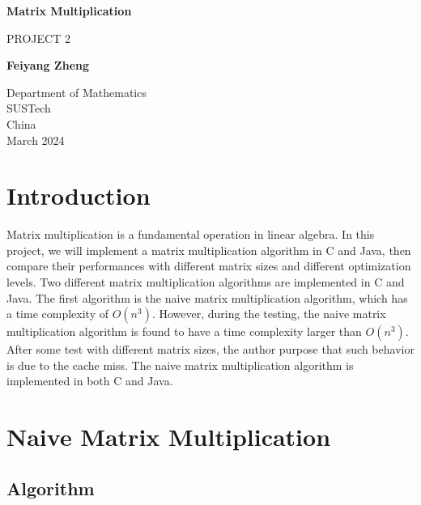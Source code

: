 \documentclass{article}
\begin{document}
\begin{titlepage}
  \begin{center}
    \vspace*{1cm}
    
    \Huge
    \textbf{Matrix Multiplication}
    
    \vspace{0.5cm}
    \LARGE
    PROJECT 2
    
    \vspace{1.5cm}
    
    \textbf{Feiyang Zheng}
    
    \vfill
    
    \vspace{0.8cm}
    
    \Large
    Department of Mathematics\\
    SUSTech\\
    China\\{March 2024}
    
  \end{center}
\end{titlepage}

\section{Introduction}

Matrix multiplication is a fundamental operation in linear algebra. In this project, we will implement a matrix multiplication algorithm in C and Java, then compare their performances with different matrix sizes and different optimization levels. Two different matrix multiplication algorithms are implemented in C and Java. The first algorithm is the naive matrix multiplication algorithm, which has a time complexity of $O(n^3)$. However, during the testing, the naive matrix multiplication algorithm is found to have a time complexity larger than $O(n^3)$. After some test with different matrix sizes, the author purpose that such behavior is due to the cache miss. The naive matrix multiplication algorithm is implemented in both C and Java.

\section{Naive Matrix Multiplication}
\subsection{Algorithm}
\end{document}

